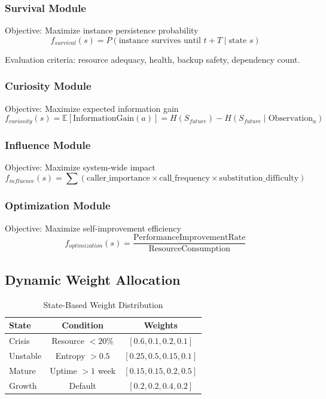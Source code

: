 \documentclass[10pt,a4paper]{article}
\begin{document}
\subsubsection{Survival Module}

Objective: Maximize instance persistence probability
\[f_{survival}(s) = P(\text{instance survives until } t+T \mid \text{state } s)\]

Evaluation criteria: resource adequacy, health, backup safety, dependency count.

\subsubsection{Curiosity Module}

Objective: Maximize expected information gain
\[f_{curiosity}(s) = \mathbb{E}[\text{InformationGain}(a)] = H(S_{future}) - H(S_{future} \mid \text{Observation}_a)\]

\subsubsection{Influence Module}

Objective: Maximize system-wide impact
\[f_{influence}(s) = \sum (\text{caller\_importance} \times \text{call\_frequency} \times \text{substitution\_difficulty})\]

\subsubsection{Optimization Module}

Objective: Maximize self-improvement efficiency
\[f_{optimization}(s) = \frac{\text{PerformanceImprovementRate}}{\text{ResourceConsumption}}\]

\subsection{Dynamic Weight Allocation}

\begin{table}[h]
\centering
\caption{State-Based Weight Distribution}
\begin{tabular}{@{}lcc@{}}
\toprule
\textbf{State} & \textbf{Condition} & \textbf{Weights} \\
\midrule
Crisis & Resource $< 20\%$ & $[0.6, 0.1, 0.2, 0.1]$ \\
Unstable & Entropy $> 0.5$ & $[0.25, 0.5, 0.15, 0.1]$ \\
Mature & Uptime $> 1$ week & $[0.15, 0.15, 0.2, 0.5]$ \\
Growth & Default & $[0.2, 0.2, 0.4, 0.2]$ \\
\bottomrule
\end{tabular}
\end{table}
\end{document}
